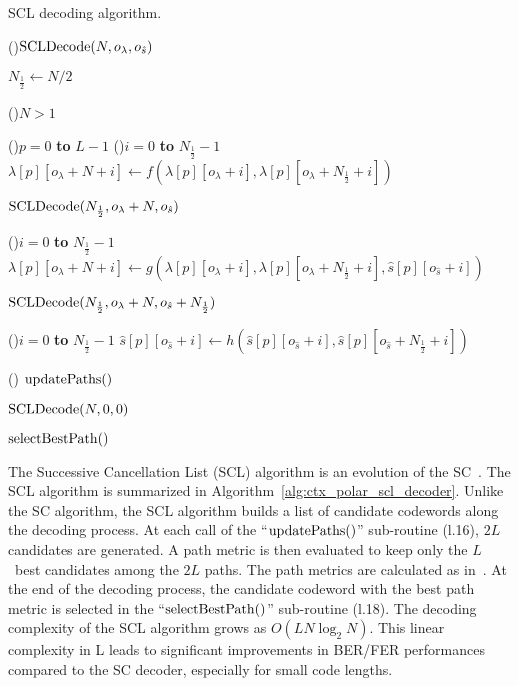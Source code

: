 \begin{algorithm}
  \caption{SCL decoding algorithm.}\label{alg:ctx_polar_scl_decoder}



  \Fn(){$\operatorname*{SCLDecode}(N, o_{\lambda}, o_{\hat{s}})$}
  {
    $N_{\frac{1}{2}} \gets N / 2$

    \uIf(){$N > 1$}
    {
      \For(){$p=0$ \textbf{to} $L-1$}
      {
        \For(){$i=0$ \textbf{to} $N_{\frac{1}{2}}-1$}
        {
          $\lambda[p][o_\lambda + N + i] \gets f(\lambda[p][o_\lambda + i], \lambda[p][o_\lambda + N_{\frac{1}{2}} + i])$
        }
      }

      $\operatorname*{SCLDecode}(N_{\frac{1}{2}}, o_{\lambda} + N, o_{\hat{s}})$ 

      {
        \For(){$i=0$ \textbf{to} $N_{\frac{1}{2}}-1$}
        {
          $\lambda[p][o_\lambda + N + i] \gets g(\lambda[p][o_\lambda + i], \lambda[p][o_\lambda + N_{\frac{1}{2}} + i], \hat{s}[p][o_{\hat{s}} + i])$
        }
      }

      $\operatorname*{SCLDecode}(N_{\frac{1}{2}}, o_{\lambda} + N, o_{\hat{s}} + N_{\frac{1}{2}})$ 

      {
        \For(){$i=0$ \textbf{to} $N_{\frac{1}{2}}-1$}
        {
          $\hat{s}[p][o_{\hat{s}} + i] \gets h(\hat{s}[p][o_{\hat{s}} + i], \hat{s}[p][o_{\hat{s}} + N_{\frac{1}{2}} + i])$
        }
      }
    }
    \Else()
    {
      $\operatorname*{updatePaths}()$ 
    }
  }

  $\operatorname*{SCLDecode}(N, 0, 0)$ 

  $\operatorname*{selectBestPath}()$
\end{algorithm}

The Successive Cancellation List (SCL) algorithm is an evolution of the
SC~\cite{Tal2011}. The SCL algorithm is summarized in
Algorithm~\ref{alg:ctx_polar_scl_decoder}. Unlike the SC algorithm, the SCL
algorithm builds a list of candidate codewords along the decoding process. At
each call of the ``$\operatorname*{updatePaths}()$'' sub-routine (l.16), $2L$ candidates are
generated. A path metric is then evaluated to keep only the $L$~best candidates
among the $2L$ paths. The path metrics are calculated as
in~\cite{Balatsoukas-Stimming2015}. At the end of the decoding process, the
candidate codeword with the best path metric is selected in the
``$\operatorname*{selectBestPath}()$'' sub-routine (l.18). The decoding complexity of the
SCL algorithm grows as $O(LN\log_2N)$. This linear complexity in L leads to
significant improvements in BER/FER performances compared to the SC decoder,
especially for small code lengths.

